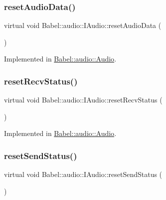 \subsubsection{\texorpdfstring{reset\+Audio\+Data()}{resetAudioData()}}
{\footnotesize\ttfamily virtual void Babel\+::audio\+::\+I\+Audio\+::reset\+Audio\+Data (\begin{DoxyParamCaption}{ }\end{DoxyParamCaption})\hspace{0.3cm}{\ttfamily [pure virtual]}}



Implemented in \hyperlink{classBabel_1_1audio_1_1Audio_a6b50d630ceea9a41088c3e5f8f4694f6}{Babel\+::audio\+::\+Audio}.

\mbox{\label{classBabel_1_1audio_1_1IAudio_ab3bd4c604b1a0e1611f280b1d27fe16b}} 
\subsubsection{\texorpdfstring{reset\+Recv\+Status()}{resetRecvStatus()}}
{\footnotesize\ttfamily virtual void Babel\+::audio\+::\+I\+Audio\+::reset\+Recv\+Status (\begin{DoxyParamCaption}{ }\end{DoxyParamCaption})\hspace{0.3cm}{\ttfamily [pure virtual]}}



Implemented in \hyperlink{classBabel_1_1audio_1_1Audio_a4d66042877979c713c9e20915b48d2d4}{Babel\+::audio\+::\+Audio}.

\mbox{\label{classBabel_1_1audio_1_1IAudio_a76c3b8c9e9dd82f13ec7684b453d7f2c}} 
\subsubsection{\texorpdfstring{reset\+Send\+Status()}{resetSendStatus()}}
{\footnotesize\ttfamily virtual void Babel\+::audio\+::\+I\+Audio\+::reset\+Send\+Status (\begin{DoxyParamCaption}{ }\end{DoxyParamCaption})\hspace{0.3cm}{\ttfamily [pure virtual]}}



